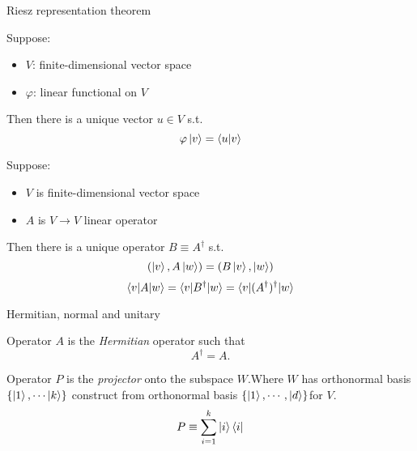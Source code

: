 \documentclass[9pt]{beamer}
\begin{document}
    \begin{frame}{Riesz representation theorem}
        \begin{theorem}
            Suppose:
            \begin{itemize}
                \item $V$: finite-dimensional vector space 
                \item $\varphi$: linear functional on $V$
            \end{itemize}
            Then there is a unique vector $u \in V$ s.t.
            $$\varphi\ket{v} = \braket{u|v}$$
        \end{theorem}
        \begin{theorem}
            Suppose:
            \begin{itemize}
                \item $V$ is finite-dimensional vector space 
                \item $A$ is $V \rightarrow V$ linear operator 
            \end{itemize}
            Then there is a unique operator $B \equiv A^\dagger$ s.t.
            $$(\ket v, A \ket w) = (B \ket v, \ket w)$$
            $$\braket{v|A|w} = \braket{v|B^\dagger |w} = \braket{v|(A^\dagger)^\dagger|w}$$
        \end{theorem}
    \end{frame}

    \begin{frame}{Hermitian, normal and unitary}
        \begin{definition}[Hermitian]
            Operator $A$ is the \textit{Hermitian} operator such that
            $$A^\dagger = A.$$
        \end{definition}
        \begin{corollary}[Projector]
            Operator $P$ is the \textit{projector} onto the subspace $W$.Where $W$ has  orthonormal basis $\{\ket 1, \cdots \ket k\}$ construct from orthonormal basis $\{ \ket 1, \cdots, \ket d \}$for $V$.
            $$P \equiv \sum^k_{i=1} \ket i \bra i $$
        \end{corollary}
    \end{frame}
    
\end{document}
